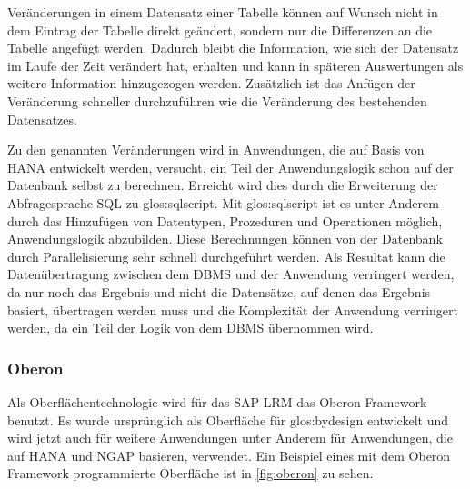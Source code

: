 Veränderungen in einem Datensatz einer Tabelle können auf Wunsch nicht in dem Eintrag der Tabelle direkt geändert, sondern nur die Differenzen an die Tabelle angefügt werden. Dadurch bleibt die Information, wie sich der Datensatz im Laufe der Zeit verändert hat, erhalten und kann in späteren Auswertungen als weitere Information hinzugezogen werden. Zusätzlich ist das Anfügen der Veränderung schneller durchzuführen wie die Veränderung des bestehenden Datensatzes.

Zu den genannten Veränderungen wird in Anwendungen, die auf Basis von \gls{HANA} entwickelt werden, versucht, ein Teil der Anwendungslogik schon auf der Datenbank selbst zu berechnen. Erreicht wird dies durch die Erweiterung der Abfragesprache \gls{SQL} zu \gls{glos:sqlscript}. Mit \gls{glos:sqlscript} ist es unter Anderem durch das Hinzufügen von Datentypen, Prozeduren und Operationen möglich, Anwendungslogik abzubilden. Diese Berechnungen können von der Datenbank durch Parallelisierung sehr schnell durchgeführt werden. Als Resultat kann die Datenübertragung zwischen dem \gls{DBMS} und der Anwendung verringert werden, da nur noch das Ergebnis und nicht die Datensätze, auf denen das Ergebnis basiert, übertragen werden muss und die Komplexität der Anwendung verringert werden, da ein Teil der Logik von dem \gls{DBMS} übernommen wird.

\subsubsection{Oberon}
Als Oberflächentechnologie wird für das SAP LRM das Oberon Framework benutzt. Es wurde ursprünglich als Oberfläche für \gls{glos:bydesign} entwickelt und wird jetzt auch für weitere Anwendungen unter Anderem für Anwendungen, die auf HANA und NGAP basieren, verwendet. Ein Beispiel eines mit dem Oberon Framework programmierte Oberfläche ist in \vref{fig:oberon} zu sehen.

